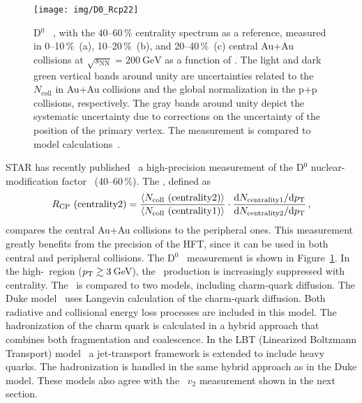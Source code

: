 \begin{figure}[!htb]
\begin{center}
 \texttt{[image: img/D0\_Rcp22]}\\
\end{center}
\caption[D$^0$ \Rcp.]{\label{dzeroRcp}D$^0$ \Rcp~\cite{D0paper}, with the 40--60$\,\%$ centrality spectrum as a reference, measured in 0--10$\,\%$~(a), 10--20$\,\%$~(b), and 20--40$\,\%$~(c) central Au+Au collisions at $\sqrt{s_\mathrm{NN}} = \SI{200}{\giga\electronvolt}$ as a function of \pt\@. The
light and dark green vertical bands around unity are uncertainties related
to the $N_\mathrm{coll}$ in Au+Au collisions and the global normalization in the p+p collisions,
respectively. The gray bands around unity depict the systematic uncertainty due to corrections on the uncertainty of the position of the primary vertex. The measurement is compared to model calculations~\cite{Duke, Duke2015, LBT, LBTprivate}.}
\end{figure}


STAR has recently published~\cite{D0paper} a high-precision measurement of the D$^0$  nuclear-modification factor \Rcp\ (40--60$\,\%$)\@. The \Rcp, defined as
\begin{equation}\label{RcpFormula}
R_\text{CP}\text{ (centrality2)} = \frac{\langle N_\mathrm{coll}\text{ (centrality2)}\rangle }
{\langle N_\mathrm{coll}\text{ (centrality1)} \rangle}
\cdot
\frac{\mathrm{d} N_\text{centrality1}/\mathrm{d} p_\mathrm{T}}
 {\mathrm{d} N_\text{centrality2}/\mathrm{d} p_\mathrm{T}}\,,
\end{equation}
compares the central Au+Au collisions to the peripheral ones. This measurement greatly benefits from the precision of the HFT, since it can be used in both central and peripheral collisions.
The D$^0$ \Rcp\ measurement is shown in Figure~\ref{dzeroRcp}. In the high-\pt\ region (${p_{\mathrm{T}}} \gtrsim 3\,$GeV), the \dzero\ production is increasingly suppressed with centrality. The \Rcp\ is compared to two models, including charm-quark diffusion. The Duke model~\cite{Duke, Duke2015} uses Langevin calculation of the charm-quark diffusion. Both radiative and collisional energy loss processes are included in this model. The hadronization of the charm quark is calculated in a hybrid approach that combines both fragmentation and coalescence. In the LBT (Linearized Boltzmann Transport) model~\cite{LBT, LBTprivate} a jet-transport framework is extended to include heavy quarks. The hadronization is handled in the same hybrid approach as in the Duke model. These models also agree with the \dzero\ $v_2$ measurement shown in the next section.


